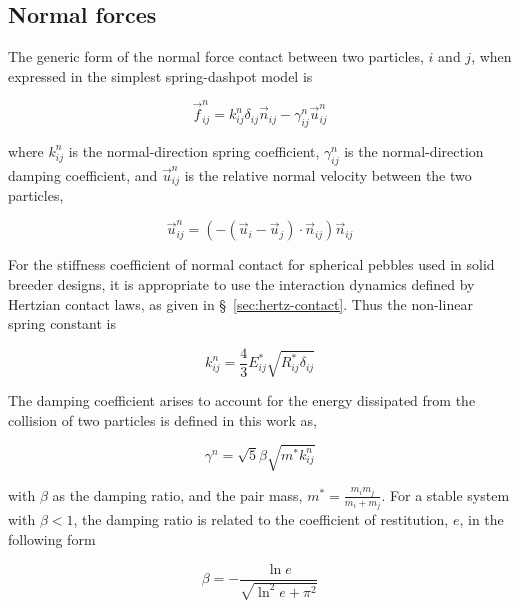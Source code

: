 \subsection{Normal forces}

The generic form of the normal force contact between two particles, $i$ and $j$, when expressed in the simplest spring-dashpot model is

\begin{equation}\label{eq:normal-force}
	\vec{f}^n_{ij} = k^n_{ij} \delta_{ij}\vec{n}_{ij} - \gamma^n_{ij} \vec{u}^n_{ij}
\end{equation}

where $k^n_{ij}$ is the normal-direction spring coefficient, $\gamma^n_{ij}$ is the normal-direction damping coefficient, and $\vec{u}^n_{ij}$ is the relative normal velocity between the two particles,

\begin{equation}
	\vec{u}^n_{ij} = (-(\vec{u}_i-\vec{u}_j)\cdot\vec{n}_{ij})\vec{n}_{ij}
\end{equation}

For the stiffness coefficient of normal contact for spherical pebbles used in solid breeder designs, it is appropriate to use the interaction dynamics defined by Hertzian contact laws, as given in \S~\ref{sec:hertz-contact}. Thus the non-linear spring constant is

\begin{equation}
	k^n_{ij} = \frac{4}{3}E_{ij}^*\sqrt{R_{ij}^*\delta_{ij}}
\end{equation}

The damping coefficient arises to account for the energy dissipated from the collision of two particles\cite{DiRenzo2004, Tsuji1992, Tsuji1993} is defined in this work as,

\begin{equation}
	\gamma^n = \sqrt{5}\beta\sqrt{m^*k^n_{ij}}
\end{equation}

with $\beta$ as the damping ratio, and the pair mass, $m^* = \frac{m_im_j}{m_i + m_j}$. For a stable system with $\beta < 1$, the damping ratio is related to the coefficient of restitution, $e$, in the following form

\begin{equation}
	\beta = -\frac{\ln{e}}{\sqrt{\ln^2{e}+\pi^2}}
\end{equation}





